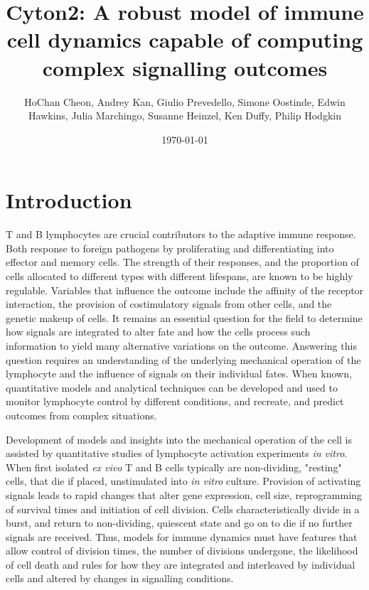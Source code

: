 \documentclass[11pt, a4paper]{article}
\title{Cyton2: A robust model of immune cell dynamics capable of computing complex signalling outcomes}
\author{HoChan Cheon, Andrey Kan, Giulio Prevedello, Simone Oostinde, Edwin Hawkins, Julia Marchingo, Susanne Heinzel, Ken Duffy, Philip Hodgkin}
\date{\today}
\begin{document}
\maketitle
\doublespacing

\nolinenumbers
\section{Introduction}
T and B lymphocytes are crucial contributors to the adaptive immune response. Both response to foreign pathogens by proliferating and differentiating into effector and memory cells. The strength of their responses, and the proportion of cells allocated to different types with different lifespans, are known to be highly regulable. Variables that influence the outcome include the affinity of the receptor interaction, the provision of costimulatory signals from other cells, and the genetic makeup of cells. It remains an essential question for the field to determine how signals are integrated to alter fate and how the cells process such information to yield many alternative variations on the outcome. Answering this question requires an understanding of the underlying mechanical operation of the lymphocyte and the influence of signals on their individual fates. When known, quantitative models and analytical techniques can be developed and used to monitor lymphocyte control by different conditions, and recreate, and predict outcomes from complex situations.

Development of models and insights into the mechanical operation of the cell is assisted by quantitative studies of lymphocyte activation experiments \textit{in vitro}. When first isolated \textit{ex vivo} T and B cells typically are non-dividing, "resting" cells, that die if placed, unstimulated into \textit{in vitro} culture. Provision of activating signals leads to rapid changes that alter gene expression, cell size, reprogramming of survival times and initiation of cell division. Cells characteristically divide in a burst, and return to non-dividing, quiescent state and go on to die if no further signals are received. Thus, models for immune dynamics must have features that allow control of division times, the number of divisions undergone, the likelihood of cell death and rules for how they are integrated and interleaved by individual cells and altered by changes in signalling conditions.
\end{document}

